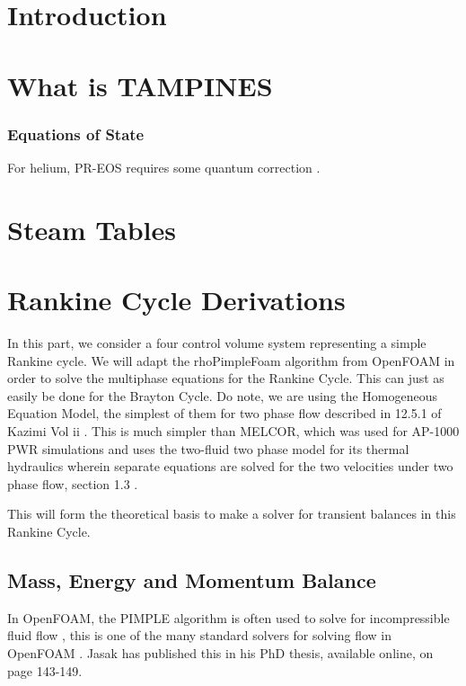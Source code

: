 \documentclass[masters]{ucbthesis}
\renewcommand{\_}{\kern-1.5pt\textunderscore\kern-1.5pt}
\begin{document}
\part{Introduction}

\part{What is TAMPINES}


\section{Equations of State}

For helium, PR-EOS requires some quantum 
correction \citep{aasen2020accurate}.


\part{Steam Tables}

\part{Rankine Cycle Derivations}

In this part, we consider a four control volume system representing a 
simple Rankine cycle. We will adapt the rhoPimpleFoam algorithm from 
OpenFOAM in order to solve the multiphase equations for the Rankine Cycle.
This can just as easily be done for the Brayton Cycle. Do note, we 
are using the Homogeneous Equation Model, the simplest of them for 
two phase flow described in 12.5.1 of Kazimi Vol ii
\citep{todreas2021nuclear}. This is much simpler than MELCOR, which 
was used for AP-1000 PWR simulations \citep{malicki2019development}
and uses the two-fluid two phase model for its thermal hydraulics \cite{kim2014sensitivity}
wherein separate equations are solved for the two velocities under two 
phase flow, section 1.3 \citep{gauntt2000melcor}.

This will form the theoretical basis to make a solver 
for transient balances in this Rankine Cycle.

\chapter{Mass, Energy and Momentum Balance}

In OpenFOAM, the PIMPLE algorithm is often used to solve for incompressible 
fluid flow \citep{devolder2015review,greenshields2022notes}, this is one of the many standard 
solvers for solving flow in OpenFOAM \citep{penttinen2011pimplefoam}.
Jasak has published this in his PhD thesis, available online,
\citep{jasak1996error} on page 143-149.
\end{document}
